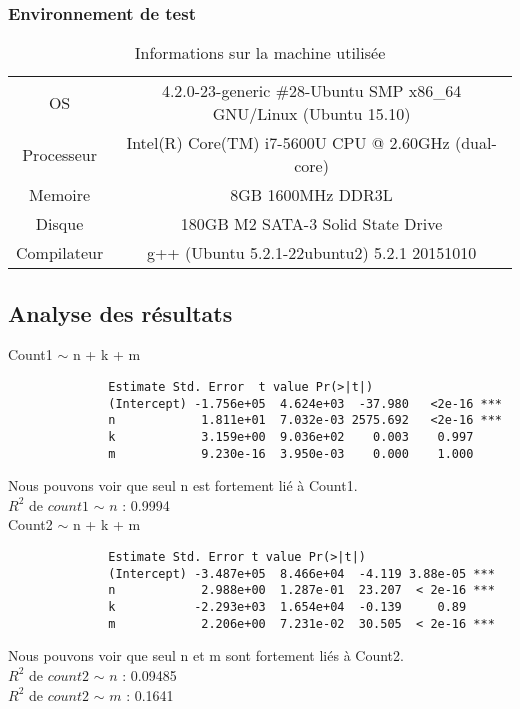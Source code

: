 \subsubsection{Environnement de test}
\begin{table}[H]
	\centering
	\caption{Informations sur la machine utilisée}
	\label{tab:environnementFournie}
	\begin{tabular}{c|c}
		\toprule
		OS & 4.2.0-23-generic \#28-Ubuntu SMP x86\_64 GNU/Linux (Ubuntu 15.10)\\
		Processeur & Intel(R) Core(TM) i7-5600U CPU @ 2.60GHz (dual-core)\\
		Memoire & 8GB 1600MHz DDR3L\\
		Disque & 180GB M2 SATA-3 Solid State Drive\\
		Compilateur & g++ (Ubuntu 5.2.1-22ubuntu2) 5.2.1 20151010\\
		\bottomrule
	\end{tabular}
\end{table}

\subsection{Analyse des résultats}

Count1 $\sim$ n + k + m
\begin{verbatim}
              Estimate Std. Error  t value Pr(>|t|)    
              (Intercept) -1.756e+05  4.624e+03  -37.980   <2e-16 ***
              n            1.811e+01  7.032e-03 2575.692   <2e-16 ***
              k            3.159e+00  9.036e+02    0.003    0.997    
              m            9.230e-16  3.950e-03    0.000    1.000   
\end{verbatim}
Nous pouvons voir que seul n est fortement lié à Count1.\\
$R^2$ de $count1$ $\sim$ $n$ : 0.9994\\

Count2 $\sim$ n + k + m
\begin{verbatim}
              Estimate Std. Error t value Pr(>|t|)    
              (Intercept) -3.487e+05  8.466e+04  -4.119 3.88e-05 ***
              n            2.988e+00  1.287e-01  23.207  < 2e-16 ***
              k           -2.293e+03  1.654e+04  -0.139     0.89    
              m            2.206e+00  7.231e-02  30.505  < 2e-16 ***
\end{verbatim}
Nous pouvons voir que seul n et m sont fortement liés à Count2.\\
$R^2$ de $count2$ $\sim$ $n$ : 0.09485\\
$R^2$ de $count2$ $\sim$ $m$ : 0.1641\\

